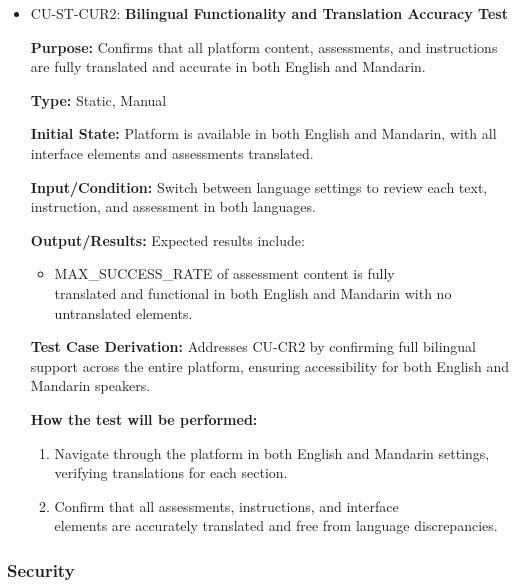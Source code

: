 \documentclass[12pt, titlepage]{article}
\begin{document}
\begin{itemize}
  \item CU-ST-CUR2: \textbf{Bilingual Functionality and Translation Accuracy Test}
  \begin{mdframed}[linewidth=0.5mm] 
    \textbf{Purpose:} Confirms that all platform content, assessments, and instructions are fully translated and accurate in both English and Mandarin. \par
    \textbf{Type:} Static, Manual \par 
    \textbf{Initial State:} Platform is available in both English and Mandarin, with all interface elements and assessments translated. \par 
    \textbf{Input/Condition:} Switch between language settings to review each text,\\
    instruction, and assessment in both languages. \par 
    \textbf{Output/Results:} Expected results include: 
    \begin{itemize} 
      \item MAX\_SUCCESS\_RATE of assessment content is fully \\translated and functional in both English and Mandarin with no \\untranslated elements. 
    \end{itemize} \par 
    \textbf{Test Case Derivation:} Addresses CU-CR2 by confirming full bilingual support across the entire platform, ensuring accessibility for both English and Mandarin speakers. \par 
    \textbf{How the test will be performed:} 
    \begin{enumerate}[noitemsep] 
      \item Navigate through the platform in both English and Mandarin settings, \\ verifying translations for each section. 
      \item Confirm that all assessments, instructions, and interface \\elements are accurately translated and free from language discrepancies. 
    \end{enumerate} 
  \end{mdframed} 

\end{itemize}

\subsubsection{Security}
\end{document}
